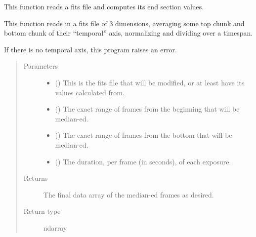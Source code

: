 \documentclass[letterpaper,10pt,english]{sphinxmanual}
\begin{document}

\begin{fulllineitems}
\label{\detokenize{python_docstrings/IfA_Smeargle.bravo.averaging:IfA_Smeargle.bravo.averaging.median_endpoints_per_second}}
This function reads a fits file and computes its end section values.

This function reads in a fits file of 3 dimensions, averaging some
top chunk and bottom chunk of their “temporal” axis, normalizing
and dividing over a timespan.

If there is no temporal axis, this program raises an error.
\begin{quote}\begin{description}
\item[{Parameters}] \leavevmode\begin{itemize}
\item {} 
 () \textendash{} This is the fits file that will be modified, or at least have its
values calculated from.

\item {} 
 () \textendash{} The exact range of frames from the beginning that will be median-ed.

\item {} 
 () \textendash{} The exact range of frames from the bottom that will be median-ed.

\item {} 
 () \textendash{} The duration, per frame (in seconds), of each exposure.

\end{itemize}

\item[{Returns}] \leavevmode
{} \textendash{} The final data array of the median-ed frames as desired.

\item[{Return type}] \leavevmode
ndarray

\end{description}\end{quote}

\end{fulllineitems}
\end{document}
